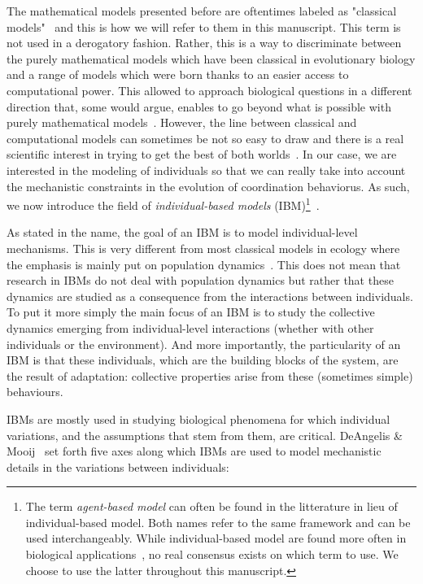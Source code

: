     The mathematical models presented before are oftentimes labeled as "classical models"~\parencite{DeAngelis2005, Adami2014} and this is how we will refer to them in this manuscript. This term is not used in a derogatory fashion. Rather, this is a way to discriminate between the purely mathematical models which have been classical in evolutionary biology and a range of models which were born thanks to an easier access to computational power. This allowed to approach biological questions in a different direction that, some would argue, enables to go beyond what is possible with purely mathematical models~\parencite{Adami2012}. However, the line between classical and computational models can sometimes be not so easy to draw and there is a real scientific interest in trying to get the best of both worlds~\parencite{Wilson1998}. In our case, we are interested in the modeling of individuals so that we can really take into account the mechanistic constraints in the evolution of coordination behaviorus. As such, we now introduce the field of \emph{individual-based models} (IBM)\footnote{The term \emph{agent-based model} can often be found in the litterature in lieu of individual-based model. Both names refer to the same framework and can be used interchangeably. While individual-based model are found more often in biological applications~\parencite{Grimm2005}, no real consensus exists on which term to use. We choose to use the latter throughout this manuscript.}~\parencite{Huston1988}.

    As stated in the name, the goal of an IBM is to model individual-level mechanisms. This is very different from most classical models in ecology where the emphasis is mainly put on population dynamics~\parencite{Grimm2005}. This does not mean that research in IBMs do not deal with population dynamics but rather that these dynamics are studied as a consequence from the interactions between individuals. To put it more simply the main focus of an IBM is to study the collective dynamics emerging from individual-level interactions (whether with other individuals or the environment). And more importantly, the particularity of an IBM is that these individuals, which are the building blocks of the system, are the result of adaptation: collective properties arise from these (sometimes simple) behaviours.

    IBMs are mostly used in studying biological phenomena for which individual variations, and the assumptions that stem from them, are critical. DeAngelis \& Mooij~\parencite{DeAngelis2005} set forth five axes along which IBMs are used to model mechanistic details in the variations between individuals:

